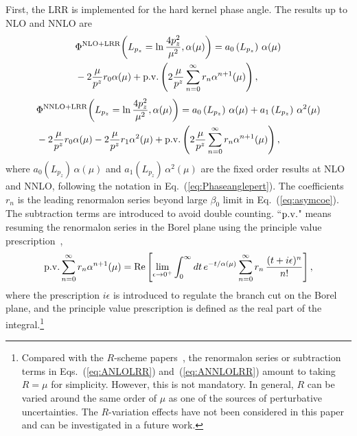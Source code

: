 \documentclass[a4paper,11pt]{article}
\begin{document}
First, the LRR is implemented for the hard kernel phase angle. The results up to NLO and NNLO are
\begin{align}\label{eq:ANLOLRR}
    &\Phi^{\rm NLO+LRR}\bigg(L_{p_z}=\ln \frac{4p_z^2}{\mu^2},\alpha(\mu)\bigg) = a_{0}\left(L_{p_z}\right) \, \alpha(\mu) \nonumber\\
    &- 2\frac{\mu}{p^z} r_{0} \alpha(\mu) + {\rm p.v.}\left(2\frac{\mu}{p^z} \sum_{n=0}^\infty r_{n} \alpha^{n+1}(\mu) \right),
\end{align}
\begin{align}\label{eq:ANNLOLRR}
    &\Phi^{\rm NNLO+LRR}\bigg(L_{p_z}=\ln \frac{4p_z^2}{\mu^2},\alpha(\mu)\bigg) = a_{0}\left(L_{p_z}\right) \, \alpha(\mu) + a_{1}\left(L_{p_z}\right) \, \alpha^2(\mu) \nonumber\\
    &- 2\frac{\mu}{p^z} r_{0} \alpha(\mu) - 2\frac{\mu}{p^z} r_{1} \alpha^2(\mu) + {\rm p.v.}\left(2\frac{\mu}{p^z} \sum_{n=0}^\infty r_{n} \alpha^{n+1}(\mu) \right),
\end{align}
where $a_{0}\left(L_{p_z}\right) \, \alpha(\mu)$ and $a_{1}\left(L_{p_z}\right) \, \alpha^2(\mu)$ are the fixed order results at NLO and NNLO, following the notation in Eq.~(\ref{eq:Phaseanglepert}). The coefficients $r_{n}$ is the leading renormalon series beyond large $\beta_0$ limit in Eq.~(\ref{eq:asymcoe}). The subtraction terms are introduced to avoid double counting. ``${\rm p.v.}$" means resuming the renormalon series in the Borel plane using the principle value prescription~\cite{Chyla:1990na,Cvetic:2002qf,Ayala:2019uaw}, 
\begin{align}\label{eq:pvrenormalon}
{\rm p.v.}\sum_{n=0}^\infty r_{n} \alpha^{n+1}(\mu) = {\rm Re}\left[ \lim_{\epsilon \rightarrow 0^{+}} \int_{0}^{\infty} d t \, e^{-t/\alpha(\mu)} \sum_{n=0}^{\infty} r_n \, \frac{(t+i \epsilon)^n}{n!} \right],
\end{align}
where the prescription $ i \epsilon$ is introduced to regulate the branch cut on the Borel plane, and the principle value prescription is defined as the real part of the integral.\footnote{Compared with the $R$-scheme papers~\cite{Hoang:2008yj,Hoang:2009yr,Benitez-Rathgeb:2022yqb}, the renormalon series or subtraction terms in Eqs.~(\ref{eq:ANLOLRR}) and~(\ref{eq:ANNLOLRR}) amount to taking $R=\mu$ for simplicity. However, this is not mandatory. In general, $R$ can be varied around the same order of $\mu$ as one of the sources of perturbative uncertainties. The $R$-variation effects have not been considered in this paper and can be investigated in a future work. } 
\end{document}
